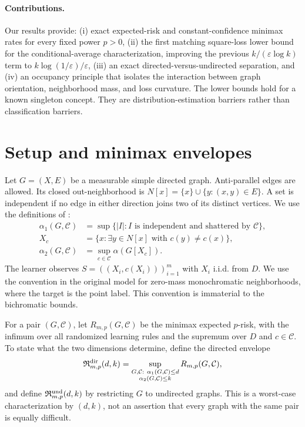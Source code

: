 \documentclass{article}
\theoremstyle{definition}
\theoremstyle{remark}
\newcommand{\cclass}{\mathcal C}
\begin{document}
\paragraph{Contributions.} Our results provide: (i) exact expected-risk and constant-confidence minimax rates for every fixed power $p>0$, (ii) the first matching square-loss lower bound for the conditional-average characterization, improving the previous $k/(\varepsilon\log k)$ term to $k\log(1/\varepsilon)/\varepsilon$, (iii) an exact directed-versus-undirected separation, and (iv) an occupancy principle that isolates the interaction between graph orientation, neighborhood mass, and loss curvature. The lower bounds hold for a known singleton concept. They are distribution-estimation barriers rather than classification barriers.

\section{Setup and minimax envelopes}
\label{sec:setup}

Let $G=(X,E)$ be a measurable simple directed graph. Anti-parallel edges are allowed. Its closed out-neighborhood is $N[x]=\{x\}\cup\{y:(x,y)\in E\}$. A set is independent if no edge in either direction joins two of its distinct vertices. We use the definitions of \citet{bressan2026conditional}:
\begin{align*}
\alpha_1(G,\cclass)&=\sup\{|I|:I\text{ is independent and shattered by }\cclass\},\\
X_c&=\{x:\exists y\in N[x]\text{ with }c(y)\ne c(x)\},\\
\alpha_2(G,\cclass)&=\sup_{c\in\cclass}\alpha(G[X_c]).
\end{align*}
The learner observes $S=((X_i,c(X_i)))_{i=1}^m$ with $X_i$ i.i.d. from $D$. We use the convention in the original model for zero-mass monochromatic neighborhoods, where the target is the point label. This convention is immaterial to the bichromatic bounds.

For a pair $(G,\cclass)$, let $R_{m,p}(G,\cclass)$ be the minimax expected $p$-risk, with the infimum over all randomized learning rules and the supremum over $D$ and $c\in\cclass$. To state what the two dimensions determine, define the directed envelope \[ \mathfrak R^{\rm dir}_{m,p}(d,k)= \sup_{\substack{G,\cclass:\ \alpha_1(G,\cclass)\leq d\\\alpha_2(G,\cclass)\leq k}} R_{m,p}(G,\cclass), \] and define $\mathfrak R^{\rm und}_{m,p}(d,k)$ by restricting $G$ to undirected graphs. This is a worst-case characterization by $(d,k)$, not an assertion that every graph with the same pair is equally difficult.
\end{document}
